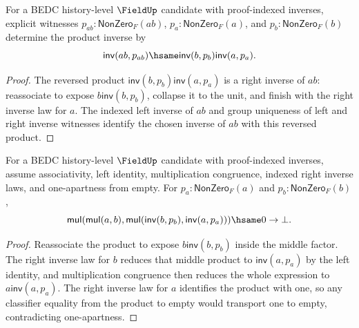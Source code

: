 \begin{theorem}
\label{thm:field-inverse-product-reverse-from-apartness}
For a BEDC history-level $\FieldUp$ candidate with proof-indexed inverses,
explicit witnesses $p_{ab}:\mathsf{NonZero}_F(ab)$,
$p_a:\mathsf{NonZero}_F(a)$, and $p_b:\mathsf{NonZero}_F(b)$ determine
the product inverse by
$$
\mathsf{inv}(ab,p_{ab})\hsame \mathsf{inv}(b,p_b)\mathsf{inv}(a,p_a).
$$
\end{theorem}
\begin{proof}
The reversed product $\mathsf{inv}(b,p_b)\mathsf{inv}(a,p_a)$ is a right
inverse of $ab$: reassociate to expose $b\mathsf{inv}(b,p_b)$, collapse it
to the unit, and finish with the right inverse law for $a$. The indexed left
inverse of $ab$ and group uniqueness of left and right inverse witnesses
identify the chosen inverse of $ab$ with this reversed product.
\end{proof}

\begin{theorem}
\label{thm:field-inverse-product-reverse-right-inverse-apart-empty-from-one-apartness}
For a BEDC history-level $\FieldUp$ candidate with proof-indexed inverses,
assume associativity, left identity, multiplication congruence, indexed right
inverse laws, and one-apartness from empty. For
$p_a:\mathsf{NonZero}_F(a)$ and $p_b:\mathsf{NonZero}_F(b)$,
$$
\mathsf{mul}(\mathsf{mul}(a,b),
  \mathsf{mul}(\mathsf{inv}(b,p_b),\mathsf{inv}(a,p_a)))\hsame0\to\bot.
$$
\end{theorem}
\begin{proof}
Reassociate the product to expose
$b\mathsf{inv}(b,p_b)$ inside the middle factor. The right inverse law for
$b$ reduces that middle product to $\mathsf{inv}(a,p_a)$ by the left identity,
and multiplication congruence then reduces the whole expression to
$a\mathsf{inv}(a,p_a)$. The right inverse law for $a$ identifies the product
with one, so any classifier equality from the product to empty would transport
one to empty, contradicting one-apartness.
\end{proof}

